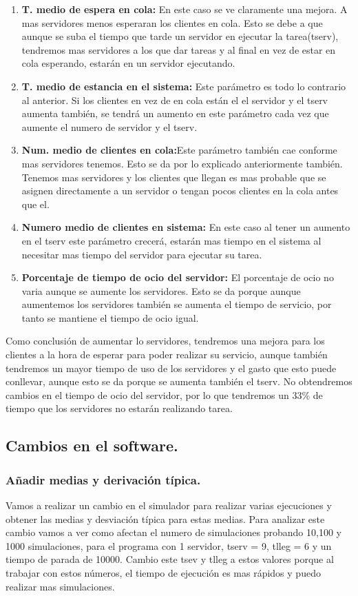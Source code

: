 \documentclass[]{article}
\begin{document}
\begin{enumerate}
	\item \textbf{T. medio de espera en cola: }En este caso se ve claramente una mejora. A mas servidores menos esperaran los clientes en cola. Esto se debe a que aunque se suba el tiempo que tarde un servidor en ejecutar la tarea(tserv), tendremos mas servidores a los que dar tareas y al final en vez de estar en cola esperando, estarán en un servidor ejecutando.
	\item \textbf{T. medio de estancia en el sistema: }Este parámetro es todo lo contrario al anterior. Si los clientes en vez de en cola están el el servidor y el tserv aumenta también, se tendrá un aumento en este parámetro cada vez que aumente el numero de servidor y el tserv. 
	\item \textbf{Num. medio de clientes en cola:}Este parámetro también cae conforme mas servidores tenemos. Esto se da por lo explicado anteriormente también. Tenemos mas servidores y los clientes que llegan es mas probable que se asignen directamente a un servidor o tengan pocos clientes en la cola antes que el. 
	
	\item \textbf{Numero medio de clientes en sistema: }En este caso al tener un aumento en el tserv este parámetro crecerá, estarán mas tiempo en el sistema al necesitar mas tiempo del servidor para ejecutar su tarea.
	
	\item \textbf{Porcentaje de tiempo de ocio del servidor: }El porcentaje de ocio no varia aunque se aumente los servidores. Esto se da porque aunque aumentemos los servidores también se aumenta el tiempo de servicio, por tanto se mantiene el tiempo de ocio igual.
\end{enumerate}
Como conclusión de aumentar lo servidores, tendremos una mejora para los clientes a la hora de esperar para poder realizar su servicio, aunque también tendremos un mayor tiempo de uso de los servidores y el gasto que esto puede conllevar, aunque esto se da porque se aumenta también el tserv. No obtendremos cambios en el tiempo de ocio del servidor, por lo que tendremos un 33\% de tiempo que los servidores no estarán realizando tarea.

\subsection{Cambios en el software.}
\subsubsection{Añadir medias y derivación típica.}
Vamos a realizar un cambio en el simulador para realizar varias ejecuciones y obtener las medias y desviación típica para estas medias. 
Para analizar este cambio vamos a ver como afectan el numero de simulaciones probando 10,100 y 1000 simulaciones, para el programa con 1 servidor, tserv = 9, tlleg = 6 y un tiempo de parada de 10000. Cambio este tsev y tlleg a estos valores porque al trabajar con estos números, el tiempo de ejecución es mas rápidos y puedo realizar mas simulaciones.
\end{document}
